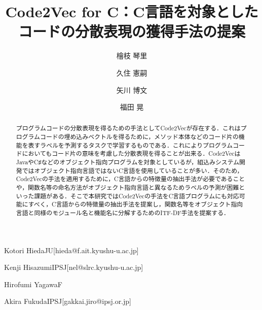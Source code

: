 \documentclass[submit,techrep,noauthor]{ipsj}
\begin{document}
\title{Code2Vec for C：C言語を対象としたコードの分散表現の獲得手法の提案}



\author{檜枝 琴里}{Kotori Hieda}{JU}[hieda@f.ait.kyushu-u.ac.jp]
\author{久住 憲嗣}{Kenji Hisazumi}{IPSJ}[nel@slrc.kyushu-u.ac.jp]
\author{矢川 博文}{Hirofumi Yagawa}{F}
\author{福田 晃}{Akira Fukuda}{IPSJ}[gakkai.jiro@ipsj.or.jp]

\begin{abstract}
プログラムコードの分散表現を得るための手法としてCode2Vecが存在する．これはプログラムコードの埋め込みベクトルを得るために，メソッド本体などのコード片の機能を表すラベルを予測するタスクで学習するものである．これによりプログラムコードにおいてもコード片の意味を考慮した分散表現を得ることが出来る．Code2VecはJavaやC♯などのオブジェクト指向プログラムを対象としているが，組込みシステム開発ではオブジェクト指向言語ではないC言語を使用していることが多い．そのため，Code2Vecの手法を適用するために，C言語からの特徴量の抽出手法が必要であることや，関数名等の命名方法がオブジェクト指向言語と異なるためラベルの予測が困難といった課題がある．そこで本研究ではCode2Vecの手法をC言語プログラムにも対応可能にすべく，C言語からの特徴量の抽出手法を提案し，関数名等をオブジェクト指向言語と同様のモジュール名と機能名に分解するためのITF-DF手法を提案する．
\end{abstract}


%
%
%
\end{document}
